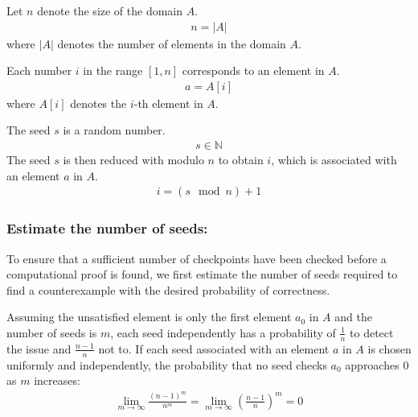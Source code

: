 \documentclass[runningheads]{llncs}
\begin{document}
Let \( n \) denote the size of the domain \( A \). 
\begin{gather*}
n = |A|
\end{gather*}
where \(|A| \) denotes the number of elements in the domain $A$.

Each number \( i \) in the range \([1, n]\) corresponds to an element in \( A \). 
\begin{gather*}
a=A[i]
\end{gather*}
where $A[i]$ denotes the $i$-th element in $A$.

The seed \( s \) is a random number. 
\begin{gather*}
s \in \mathbb{N} 
\end{gather*}
The seed $s$  is then reduced with modulo \( n \) to obtain \( i \), which is associated with an element \( a \) in \( A \).
\begin{gather}
\label{eq:11}
i = (s\mod n) + 1
\end{gather}
\subsubsection{Estimate the number of seeds:} To ensure that a sufficient number of checkpoints have been checked before a computational proof is found, we first estimate the number of seeds required to find a counterexample with the desired probability of correctness.

Assuming the unsatisfied element is only the first element \( a_0 \) in \( A \) and the number of seeds is \( m \), each seed independently has a probability of \( \frac{1}{n} \) to detect the issue and \( \frac{n-1}{n} \) not to. If each seed associated with an element \( a \) in \( A \) is chosen uniformly and independently, the probability that no seed checks \( a_0 \) approaches 0 as \( m \) increases:
\begin{gather*}
\lim_{m \to \infty} \frac{(n-1)^m}{n^m} = \lim_{m \to \infty} \left( \frac{n-1}{n} \right)^m = 0
\end{gather*}
\end{document}
